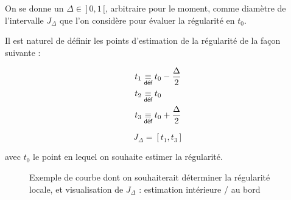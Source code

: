 \smallskip

On se donne un $\Delta \in \, ] \, 0,1 \,[$, arbitraire pour le moment, comme diamètre de l'intervalle $J_\Delta$ que l'on considère pour évaluer la régularité en $t_0$.

Il est naturel de définir les points d'estimation de la régularité de la façon suivante :

\begin{minipage}{0.5\textwidth}
	\begin{align*}
		t_1 & \isdef t_0 - \frac \Delta 2 \\
		t_2 & \isdef t_0                  \\
		t_3 & \isdef t_0 + \frac \Delta 2
	\end{align*}
\end{minipage}
\hfill
\begin{minipage}{0.5\textwidth}
	\begin{equation*}
		J_\Delta = [t_1, t_3]
	\end{equation*}

	\begin{center}
		avec $t_0$ le point en lequel on souhaite estimer la régularité.
	\end{center}
\end{minipage}


\begin{figure}[H]
	\centering
	\begin{minipage}{0.45\linewidth}
		\scalebox{0.885}{
			
		}
	\end{minipage}
	\hfill
	\begin{minipage}{0.45\linewidth}
		\scalebox{0.885}{
			
		}
	\end{minipage}
	\label{fig:delta_method_example}
	\caption{Exemple de courbe dont on souhaiterait déterminer la régularité locale, et visualisation de $J_\Delta$ : estimation intérieure / au bord}
\end{figure}

